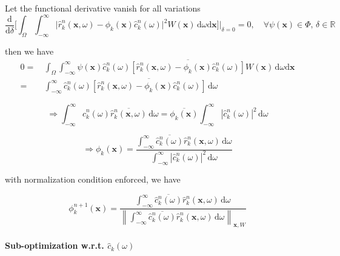 \documentclass[12pt]{article}
\numberwithin{equation}{section}
\begin{document}
Let the functional derivative vanish for all variations
\begin{equation}
	\frac{\mathrm{d}}{\mathrm{d}\delta} \Bigg[\int_\Omega\int_{-\infty}^\infty \bigg|\hat{r}_k^n(\boldsymbol{x},\omega)-\phi_k(\boldsymbol{x})\hat{c}_k^n(\omega)\bigg|^2 W(\bm{x})\,\mathrm{d}\omega\mathrm{d}\boldsymbol{x}\Bigg]\Bigg|_{\delta=0}=0,\quad \forall\psi(\bm{x})\in \Phi,\,\delta\in\mathbb{R}
\end{equation}

then we have
\begin{align}
	0=&\,\int_\Omega\int_{-\infty}^\infty \psi(\bm{x})\hat{c}_k^n(\omega)\overline{\left[\hat{r}_k^n(\boldsymbol{x},\omega)-\phi_k(\boldsymbol{x})\hat{c}_k^n(\omega)\right]} W(\bm{x})\,\mathrm{d}\omega\mathrm{d}\boldsymbol{x} \\
	=&\,\int_{-\infty}^\infty \hat{c}_k^n(\omega)\overline{\left[\hat{r}_k^n(\boldsymbol{x},\omega)-\phi_k(\boldsymbol{x})\hat{c}_k^n(\omega)\right]} \,\mathrm{d}\omega
\end{align}

\begin{equation}
	\Rightarrow\int_{-\infty}^\infty \hat{c}_k^n(\omega)\overline{\hat{r}_k^n(\boldsymbol{x},\omega)} \,\mathrm{d}\omega=\overline{\phi_k(\boldsymbol{x})}\int_{-\infty}^\infty \left|\hat{c}_k^n(\omega)\right|^2 \,\mathrm{d}\omega
\end{equation}

\begin{equation}
	\Rightarrow
	\phi_k(\boldsymbol{x})=
	\frac{\int_{-\infty}^\infty \overline{\hat{c}_k^n(\omega)}{\hat{r}_k^n(\boldsymbol{x},\omega)} \,\mathrm{d}\omega}{\int_{-\infty}^\infty \left|\hat{c}_k^n(\omega)\right|^2 \,\mathrm{d}\omega}
\end{equation}

with normalization condition enforced, we have

\begin{equation}
	\phi_k^{n+1}(\boldsymbol{x})=
	\frac{\int_{-\infty}^\infty \overline{\hat{c}_k^n(\omega)}{\hat{r}_k^n(\boldsymbol{x},\omega)} \,\mathrm{d}\omega}{\left\|\int_{-\infty}^\infty \overline{\hat{c}_k^n(\omega)}{\hat{r}_k^n(\boldsymbol{x},\omega)} \,\mathrm{d}\omega\right\|_{\bm{x},W}}
\end{equation}

\paragraph{Sub-optimization w.r.t. $\hat{c}_k(\omega)$}
\end{document}
